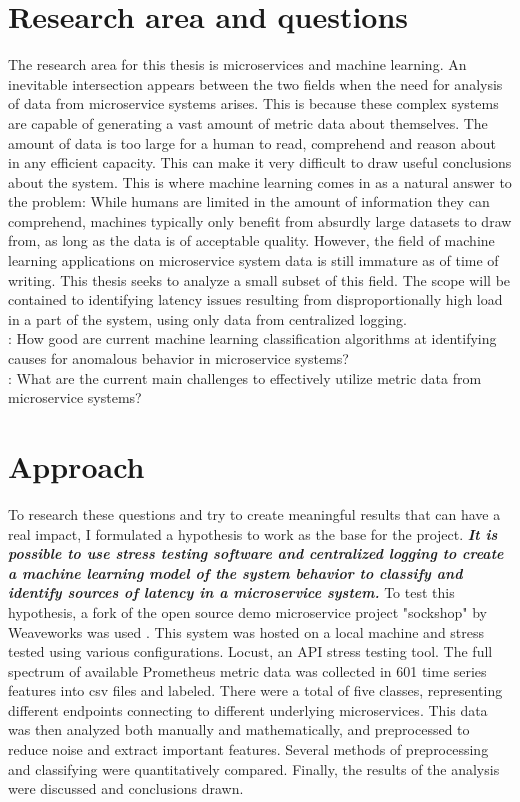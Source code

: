 \section{Research area and questions}
The research area for this thesis is microservices and machine learning. An inevitable intersection appears between the two fields
when the need for analysis of data from microservice systems arises. This is because these complex systems are capable of generating a 
vast amount of metric data about themselves. The amount of data is too large for a human to read, comprehend and reason about in any efficient capacity. 
This can make it very difficult to draw useful conclusions about the system. This is where machine learning comes in as a natural answer to the problem:
While humans are limited in the amount of information they can comprehend, machines typically only benefit from absurdly large datasets to draw from, as long as
the data is of acceptable quality. However, the field of machine learning applications on microservice system data is still immature as of time of writing. 
This thesis seeks to analyze a small subset of this field. The scope will be contained to identifying latency issues resulting from disproportionally high load in a part of the system, using only data from centralized logging.\\
: How good are current machine learning classification algorithms at identifying causes for anomalous behavior in microservice systems?\\
: What are the current main challenges to effectively utilize metric data from microservice systems?

\section{Approach}
To research these questions and try to create meaningful results that can have a real impact, I formulated a hypothesis to work as the base for the project. 
\textbf{\textit{It is possible to use stress testing software and centralized logging to create a machine learning model of the system behavior to classify and identify sources of latency in a microservice system.}}
To test this hypothesis, a fork of the open source demo microservice project "sockshop" by Weaveworks was used \cite*{Microservices-demo-sockshop}. This system was hosted on a local machine and stress tested using various configurations.
Locust, an API stress testing tool. The full spectrum of available Prometheus metric data was collected in 601 time series features into csv files and labeled. There were a total of five classes, representing different endpoints connecting to different underlying microservices.
This data was then analyzed both manually and mathematically, and preprocessed to reduce noise and extract important features. 
Several methods of preprocessing and classifying were quantitatively compared. Finally, the results of the analysis were discussed and conclusions drawn.

